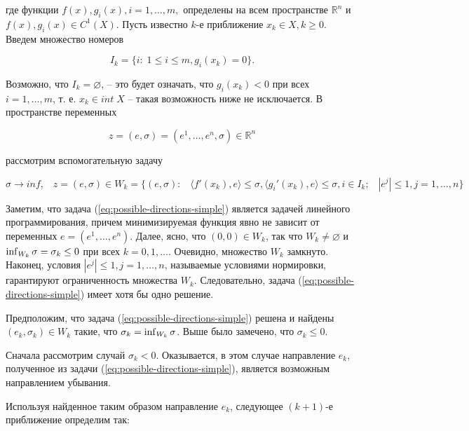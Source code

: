 \documentclass[a4paper, 12pt, titlepage]{article}
\theoremstyle{definition}
\theoremstyle{plain}
\theoremstyle{plain}
\begin{document}
где функции $f(x), g_{i}(x), i = 1, \ldots, m,$ определены на всем пространстве
$\mathbb{R}^{n}$ и $f(x), g_{i}(x) \in C^{1}(X)$. Пусть известно $k$-е
приближение $x_{k} \in X, k \geq 0$. Введем множество номеров

\begin{equation}
 I_{k} = \{i: \; 1 \leq i \leq m, g_{i}(x_{k}) = 0\}.
\end{equation}

Возможно, что $I_{k} = \varnothing$, -- это будет означать, что
$g_{i}(x_{k}) < 0$ при всех $i = 1, \ldots, m$, т. е. $x_{k} \in int \; X$ --
такая возможность ниже не исключается. В пространстве переменных

\begin{equation}
 z = (e, \sigma) = (e^{1}, \ldots, e^{n}, \sigma) \in \mathbb{R}^{n}
\end{equation}

рассмотрим вспомогательную задачу

\begin{equation}
\label{eq:possible-directions-simple}
\sigma \to inf, \;\;\; z = (e, \sigma) \in W_{k} =
\{(e, \sigma): \;\;\; \langle f'(x_{k}), e \rangle \leq \sigma,
\langle g_{i}'(x_{k}), e \rangle \leq \sigma, i \in I_{k}; \;\;\;
|e^{j}| \leq 1, j = 1, \ldots, n \} 
\end{equation}

Заметим, что задача (\ref{eq:possible-directions-simple}) является задачей
линейного программирования, причем минимизируемая функция явно не зависит от 
переменных $e = (e^{1}, \ldots, e^{n})$. Далее, ясно, что $(0, 0) \in W_{k}$,
так что $W_{k} \neq \varnothing$ и
$\operatornamewithlimits{inf}_{W_{k}} \sigma = \sigma_{k} \leq 0$ при всех
$k = 0, 1, \ldots$. Очевидно, множество $W_{k}$ замкнуто. Наконец, условия
$|e^{j}| \leq 1, j = 1, \ldots, n$, называемые условиями нормировки,
гарантируют ограниченность множества $W_{k}$. Следовательно, задача
(\ref{eq:possible-directions-simple}) имеет хотя бы одно решение.

Предположим, что задача (\ref{eq:possible-directions-simple}) решена и найдены
$(e_{k}, \sigma_{k}) \in W_{k}$ такие, что
$\sigma_{k} = \operatornamewithlimits{inf}_{W_{k}} \sigma$. Выше было замечено,
что $\sigma_{k} \leq 0$.

Сначала рассмотрим случай $\sigma_{k} < 0$. Оказывается, в этом случае
направление $e_{k}$, полученное из задачи (\ref{eq:possible-directions-simple}),
является возможным направлением убывания.

Используя найденное таким образом направление $e_{k}$, следующее $(k + 1)$-е
приближение определим так:
\end{document}
